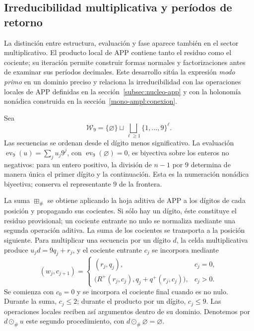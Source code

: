 \subsection{Irreducibilidad multiplicativa y períodos de retorno}
\label{primos-retornos}

La distinción entre estructura, evaluación y fase aparece también en el
sector multiplicativo. El producto local de APP contiene tanto el residuo
como el cociente; su iteración permite construir formas normales y
factorizaciones antes de examinar sus períodos decimales. Este desarrollo
sitúa la expresión \emph{modo primo} en un dominio preciso y relaciona la
irreducibilidad con las operaciones locales de APP definidas en la
sección~\ref{subsec:nucleo-app} y con la holonomía nonádica construida en la
sección~\ref{mono-ampl:conexion}.

Sea
\[
 \mathcal W_9=\{\varnothing\}\sqcup
 \bigsqcup_{\ell\geq1}\{1,\ldots,9\}^{\ell}.
\]
Las secuencias se ordenan desde el dígito menos significativo. La evaluación
\(\operatorname{ev}_9(u)=\sum_j u_j9^j\), con
\(\operatorname{ev}_9(\varnothing)=0\), es biyectiva sobre los enteros no
negativos: para un entero positivo, la división de \(n-1\) por \(9\)
determina de manera única el primer dígito y la continuación. Esta es la
numeración nonádica biyectiva; conserva el representante \(9\) de la
frontera.

La suma \(\boxplus_\#\) se obtiene aplicando la hoja aditiva de APP a los
dígitos de cada posición y propagando sus cocientes. Si sólo hay un dígito,
éste constituye el residuo provisional; un cociente entrante no nulo se
normaliza mediante una segunda operación aditiva. La suma de los
cocientes se transporta a la posición siguiente. Para multiplicar una
secuencia por un dígito \(d\), la celda multiplicativa produce
\(u_jd=9q_j+r_j\), y el cociente entrante \(c_j\) se incorpora mediante
\[
 (w_j,c_{j+1})=
 \begin{cases}
 (r_j,q_j),&c_j=0,\\
 \bigl(R^+(r_j,c_j),q_j+q^+(r_j,c_j)\bigr),&c_j>0.
 \end{cases}
\]
Se comienza con \(c_0=0\) y se incorpora el cociente final cuando es no
nulo. Durante la suma, \(c_j\leq2\); durante el producto por un dígito,
\(c_j\leq9\). Las operaciones locales reciben así argumentos dentro
de su dominio. Denotemos por \(d\odot_\#u\) este segundo procedimiento,
con \(d\odot_\#\varnothing=\varnothing\).

